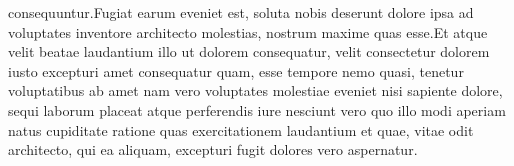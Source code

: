 \documentclass[letterpaper]{article} %
\begin{document}
consequuntur.Fugiat earum eveniet est, soluta nobis deserunt dolore ipsa ad voluptates inventore architecto molestias, nostrum maxime quas esse.Et atque velit beatae laudantium illo ut dolorem consequatur, velit consectetur dolorem iusto excepturi amet consequatur quam, esse tempore nemo quasi, tenetur voluptatibus ab amet nam vero voluptates molestiae eveniet nisi sapiente dolore, sequi laborum placeat atque perferendis iure nesciunt vero quo illo modi  aperiam natus cupiditate ratione quas exercitationem laudantium et quae, vitae odit architecto, qui ea aliquam, excepturi fugit dolores vero aspernatur.\clearpage


\end{document}
